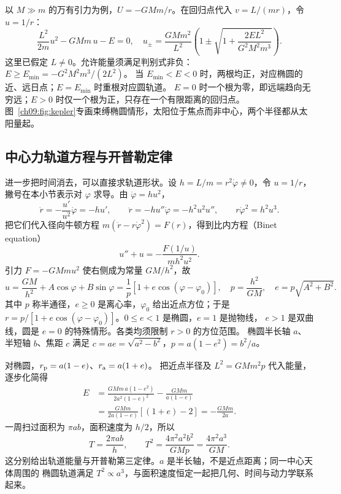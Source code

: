 {以 $M\gg m$ 的万有引力为例，$U=-GMm/r$。在回归点代入 $v=L/(mr)$，令 $u=1/r$：
\begin{equation}
 \frac{L^2}{2m}u^2-GMm\,u-E=0,
 \quad
 u_\pm=\frac{GMm^2}{L^2}
 \left(1\pm\sqrt{1+\frac{2EL^2}{G^2M^2m^3}}\right).
\end{equation}
这里已假定 $L\ne0$。允许能量须满足判别式非负：
$E\ge E_{\min}=-G^2M^2m^3/(2L^2)$。
当 $E_{\min}<E<0$ 时，两根均正，对应椭圆的近、远日点；$E=E_{\min}$ 时重根对应圆轨道。
$E=0$ 时一个根为零，即远端趋向无穷远；$E>0$ 时仅一个根为正，只存在一个有限距离的回归点。
图~\ref{ch09:fig:kepler}专画束缚椭圆情形，太阳位于焦点而非中心，两个半径都从太阳量起。
\keplerContextDiagram

\subsection{中心力轨道方程与开普勒定律}
进一步把时间消去，可以直接求轨道形状。设 $h=L/m=r^2\dot\varphi\ne0$，令 $u=1/r$，
撇号在本小节表示对 $\varphi$ 求导。由 $\dot\varphi=hu^2$，
\begin{equation}
 \dot r=-\frac{u'}{u^2}\dot\varphi=-hu',\qquad
 \ddot r=-h u''\dot\varphi=-h^2u^2u'',\qquad
 r\dot\varphi^2=h^2u^3.
\end{equation}
把它们代入径向牛顿方程 $m(\ddot r-r\dot\varphi^2)=F(r)$，得到比内方程（Binet equation）
\begin{equation}
 u''+u=-\frac{F(1/u)}{mh^2u^2}.
\end{equation}
引力 $F=-GMmu^2$ 使右侧成为常量 $GM/h^2$，故
\begin{equation}
 u=\frac{GM}{h^2}+A\cos\varphi+B\sin\varphi
 =\frac1p[1+e\cos(\varphi-\varphi_0)],
 \quad p=\frac{h^2}{GM},\quad e=p\sqrt{A^2+B^2}.
\end{equation}
其中 $p$ 称半通径，$e\ge0$ 是离心率，$\varphi_0$ 给出近点方位；于是
$r=p/[1+e\cos(\varphi-\varphi_0)]$。$0\le e<1$ 是椭圆，$e=1$ 是抛物线，
$e>1$ 是双曲线，圆是 $e=0$ 的特殊情形。各类均须限制 $r>0$ 的方位范围。
椭圆半长轴 $a$、半短轴 $b$、焦距 $c$ 满足
$c=ae=\sqrt{a^2-b^2}$，$p=a(1-e^2)=b^2/a$。

对椭圆，$r_{\rm p}=a(1-e)$、$r_{\rm a}=a(1+e)$。
把近点半径及 $L^2=GMm^2p$ 代入能量，逐步化简得
\begin{align}
 E&=\frac{GMm\,a(1-e^2)}{2a^2(1-e)^2}-\frac{GMm}{a(1-e)}\\
 &=\frac{GMm}{2a(1-e)}[(1+e)-2]
 =-\frac{GMm}{2a}.
\end{align}
一周扫过面积为 $\pi ab$，面积速度为 $h/2$，所以
\begin{equation}
 T=\frac{2\pi ab}{h},\qquad
 T^2=\frac{4\pi^2a^2b^2}{GMp}=\frac{4\pi^2a^3}{GM}.
\end{equation}
这分别给出轨道能量与开普勒第三定律。$a$ 是半长轴，不是近点距离；同一中心天体周围的
椭圆轨道满足 $T^2\propto a^3$，与面积速度恒定一起把几何、时间与动力学联系起来。

}
